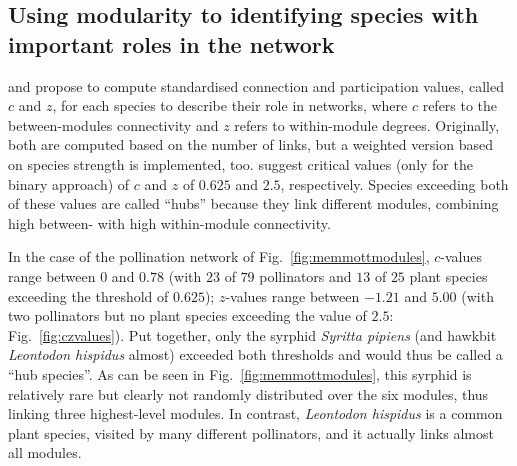 \documentclass[a4paper, 11pt]{article}
\begin{document}
\subsection{Using modularity to identifying species with important roles in the network}
\citet{Guimera2005} and \citet{Olesen2007} propose to compute standardised connection and participation values, called $c$ and $z$, for each species to describe their role in networks, where $c$ refers to the between-modules connectivity \citep[called ``participation coefficient'' $P$][]{Guimera2005} and $z$ refers to within-module degrees. Originally, both are computed based on the number of links, but a weighted version based on species strength is implemented, too. \citet{Guimera2005} suggest critical values (only for the binary approach) of $c$ and $z$ of $0.625$ and $2.5$, respectively. Species exceeding both of these values are called ``hubs'' because they link different modules, combining high between- with high within-module connectivity. 

In the case of the pollination network of Fig.~\ref{fig:memmottmodules}, $c$-values range between $0$ and $0.78$ (with $23$ of $79$ pollinators and $13$ of $25$ plant species exceeding the threshold of $0.625$); $z$-values range between $-1.21$ and $5.00$ (with two pollinators but no plant species exceeding the value of $2.5$: Fig.~\ref{fig:czvalues}). Put together, only the syrphid \emph{Syritta pipiens} (and hawkbit \emph{Leontodon hispidus} almost) exceeded both thresholds and would thus be called a ``hub species''. As can be seen in Fig.~\ref{fig:memmottmodules}, this syrphid is relatively rare but clearly not randomly distributed over the six modules, thus linking three highest-level modules. In contrast, \emph{Leontodon hispidus} is a common plant species, visited by many different pollinators, and it actually links almost all modules. 
\end{document}
